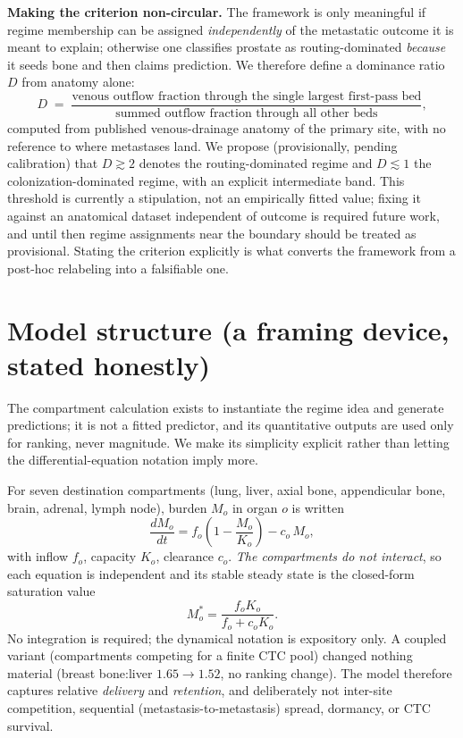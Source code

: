 \documentclass[11pt]{article}
\begin{document}
\textbf{Making the criterion non-circular.} The framework is only meaningful if
regime membership can be assigned \emph{independently} of the metastatic outcome
it is meant to explain; otherwise one classifies prostate as routing-dominated
\emph{because} it seeds bone and then claims prediction. We therefore define a
dominance ratio $D$ from anatomy alone:
\[
  D \;=\; \frac{\text{venous outflow fraction through the single largest first-pass bed}}
                {\text{summed outflow fraction through all other beds}},
\]
computed from published venous-drainage anatomy of the primary site, with no
reference to where metastases land. We propose (provisionally, pending
calibration) that $D \gtrsim 2$ denotes the routing-dominated regime and
$D \lesssim 1$ the colonization-dominated regime, with an explicit intermediate
band. This threshold is currently a stipulation, not an empirically fitted value;
fixing it against an anatomical dataset independent of outcome is required future
work, and until then regime assignments near the boundary should be treated as
provisional. Stating the criterion explicitly is what converts the framework from
a post-hoc relabeling into a falsifiable one.

\section{Model structure (a framing device, stated honestly)}

The compartment calculation exists to instantiate the regime idea and generate
predictions; it is not a fitted predictor, and its quantitative outputs are used
only for ranking, never magnitude. We make its simplicity explicit rather than
letting the differential-equation notation imply more.

For seven destination compartments (lung, liver, axial bone, appendicular bone,
brain, adrenal, lymph node), burden $M_o$ in organ $o$ is written
\[
  \frac{dM_o}{dt} = f_o\left(1 - \frac{M_o}{K_o}\right) - c_o\, M_o ,
\]
with inflow $f_o$, capacity $K_o$, clearance $c_o$. \emph{The compartments do not
interact}, so each equation is independent and its stable steady state is the
closed-form saturation value
\[
  M_o^\ast = \frac{f_o K_o}{f_o + c_o K_o}.
\]
No integration is required; the dynamical notation is expository only. A coupled
variant (compartments competing for a finite CTC pool) changed nothing material
(breast bone:liver $1.65\to1.52$, no ranking change). The model therefore captures
relative \emph{delivery} and \emph{retention}, and deliberately not inter-site
competition, sequential (metastasis-to-metastasis) spread, dormancy, or CTC
survival.
\end{document}
